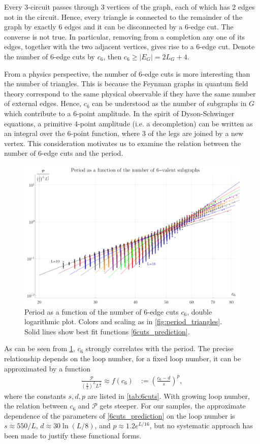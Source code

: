 \documentclass[12pt,a4paper]{article}
\newcommand{\abs}[1]{\lvert #1 \rvert}
\newcommand{\period}{\mathcal P}
\renewcommand{\|}{\rule[-0.4ex]{0.2ex}{1.2em}}
\begin{document}
Every 3-circuit passes through 3 vertices of the graph, each of which has 2 edges not in the circuit. Hence, every triangle is connected to the remainder of the graph by exactly 6 edges and it can be disconnected by a 6-edge cut. The converse is not true. In particular,  removing from a completion any one of its edges, together with the two adjacent vertices, gives rise to a 6-edge cut. Denote the number of 6-edge cuts by $c_6$, then $c_6 \geq \abs{E_G}= 2 L_G + 4$.  
 
From a physics perspective, the number of 6-edge cuts is more interesting than the number of triangles. This is because the Feynman graphs in quantum field theory correspond to the same physical observable if they have the same number of external edges. Hence, $c_6$ can be understood as the number of subgraphs in $G$ which contribute to a 6-point amplitude. In the spirit of Dyson-Schwinger equations, a primitive 4-point amplitude (i.e. a decompletion) can be written as an integral over the 6-point function,   where 3 of the legs are joined by a new vertex. This   consideration  motivates us to examine the relation between the number of 6-edge cuts and the period.


\begin{figure}[htb]
	\centering
	\includegraphics[width=.9\linewidth]{period_6cuts}
	\caption{Period  as a function of the number of 6-edge cuts $c_6$, double logarithmic plot. Colors and scaling as in \cref{fig:period_triangles}. Solid lines show best fit functions \cref{6cuts_prediction}.}
	\label{fig:period_6cuts}
\end{figure}

As can be seen from \cref{fig:period_6cuts}, $c_6$ strongly correlates with the period. The precise relationship depends on the loop number, for a fixed loop number, it can be approximated by a function
\begin{align}\label{6cuts_prediction}
	\frac{\period}{\left( \frac 32 \right) ^L L^{\frac 52}}\approx f(c_6) &:= \left( \frac{c_6-d}{s}  \right) ^p,
\end{align}
where the constants $s,d,p$ are listed in  \cref{tab:6cuts}. With growing loop number, the relation between $c_6$ and $\period$ gets steeper. For our samples, the approximate dependence of the parameters of \cref{6cuts_prediction} on the loop number is $s \approx 550/L$, $d \approx 30 \ln (L/8)$, and $p \approx 1.2 e^{L/16}$, but no systematic approach has been made to justify these functional forms. 
\end{document}
